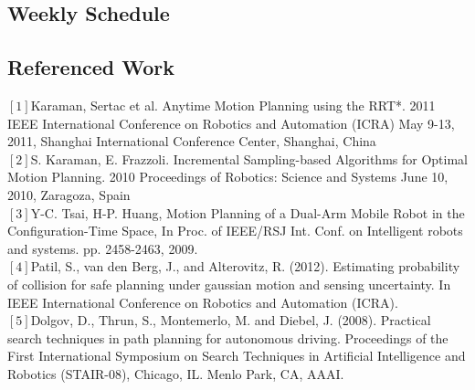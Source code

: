 \documentclass[12pt]{article}
\begin{document}
\subsection*{Weekly Schedule}

\subsection*{Referenced Work}
            $[1]$Karaman, Sertac et al. Anytime Motion Planning using the RRT*. 2011 IEEE International Conference on Robotics and Automation (ICRA) May 9-13, 2011, Shanghai International Conference Center, Shanghai, China\\
            $[2]$S. Karaman, E. Frazzoli. Incremental Sampling-based Algorithms for Optimal Motion Planning. 2010 Proceedings of Robotics: Science and Systems June 10, 2010, Zaragoza, Spain\\
            $[3]$Y-C. Tsai, H-P. Huang, Motion Planning of a Dual-Arm Mobile Robot in the Configuration-Time Space, In Proc. of IEEE/RSJ Int. Conf. on Intelligent robots and systems. pp. 2458-2463, 2009. \\
            $[4]$Patil, S., van den Berg, J., and Alterovitz, R. (2012). Estimating probability of collision for safe planning under gaussian motion and sensing uncertainty. In IEEE International Conference on Robotics and Automation (ICRA).\\
            $[5]$Dolgov, D., Thrun, S., Montemerlo, M. and Diebel, J. (2008). Practical search techniques in path planning for autonomous driving. Proceedings of the First International Symposium on Search Techniques in Artificial Intelligence and Robotics (STAIR-08), Chicago, IL. Menlo Park, CA, AAAI.\\
\end{document}
